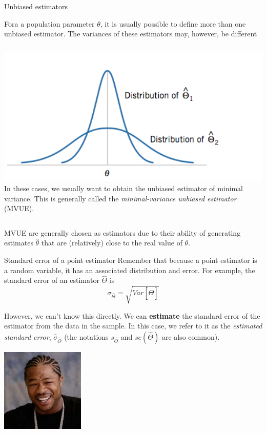 \begin{frame}{Unbiased estimators}

Fora a population parameter $\theta$, it is usually possible to define more than one unbiased estimator. The variances of these estimators may, however, be different\bigskip

\begin{columns}[T]
    \vspace{-1.5em} \includegraphics[width=1\textwidth]{../img/unbiased_variance.png}
     In these cases, we usually want to obtain the unbiased estimator of minimal variance. This is generally called the \textit{minimal-variance unbiased estimator} (MVUE).
\end{columns}\bigskip

MVUE are generally chosen as estimators due to their ability of generating estimates $\hat{\theta}$ that are (relatively) close to the real value of $\theta$.
\end{frame}


\begin{frame}{Standard error of a point estimator}
Remember that because a point estimator is a random variable, it has an associated distribution and error. For example, the standard error of an estimator $\hat{\Theta}$ is
\begin{equation*}
\sigma_{\hat{\Theta}} = \sqrt{Var\left[\hat{\Theta}\right]}
\end{equation*}\bigskip

However, we can't know this directly. We can {\bf estimate} the standard error of the estimator from the data in the sample. In this case, we refer to it as the \textit{estimated standard error}, $\hat{\sigma}_{\hat{\Theta}}$ (the notations $s_{\hat{\Theta}}$ and $se(\hat{\Theta})$ are also common).

\hfill\includegraphics[width=.1\textwidth]{../img/yodawg}
\end{frame}

